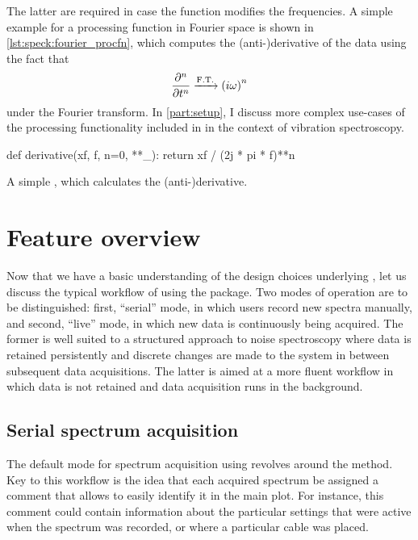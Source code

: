The latter are required in case the function modifies the frequencies.
A simple example for a processing function in Fourier space is shown in \cref{lst:speck:fourier_procfn}, which computes the \mbox{(anti-)}derivative of the data using the fact that
\begin{align}\label{eq:speck:fourier_derivative}
    \pdv[n]{t} \xrightarrow{\mathrm{F.T.}} \left(i\omega\right)^n
\end{align}
under the Fourier transform.
In \cref{part:setup}, I discuss more complex use-cases of the processing functionality included in \pyspeck in the context of vibration spectroscopy.

\begin{marginlisting}[*8]
    \begin{py}[fontsize=\footnotesize]
        def derivative(xf, f, n=0, **_):
            return xf / (2j * pi * f)**n
    \end{py}
    \caption[Simple  example]{A simple , which calculates the \mbox{(anti-)}derivative.}
    \label{lst:speck:fourier_procfn}
\end{marginlisting}

\section{Feature overview}\label{sec:speck:software:features}
Now that we have a basic understanding of the design choices underlying \pyspeck, let us discuss the typical workflow of using the package.
Two modes of operation are to be distinguished: first, \enquote{serial} mode, in which users record new spectra manually, and second, \enquote{live} mode, in which new data is continuously being acquired.
The former is well suited to a structured approach to noise spectroscopy where data is retained persistently and discrete changes are made to the system in between subsequent data acquisitions.
The latter is aimed at a more fluent workflow in which data is not retained and data acquisition runs in the background.

\subsection{Serial spectrum acquisition}\label{subsec:speck:software:features:serial}
The default mode for spectrum acquisition using \pyspeck revolves around the  method.
Key to this workflow is the idea that each acquired spectrum be assigned a comment that allows to easily identify it in the main plot.
For instance, this comment could contain information about the particular settings that were active when the spectrum was recorded, or where a particular cable was placed.

